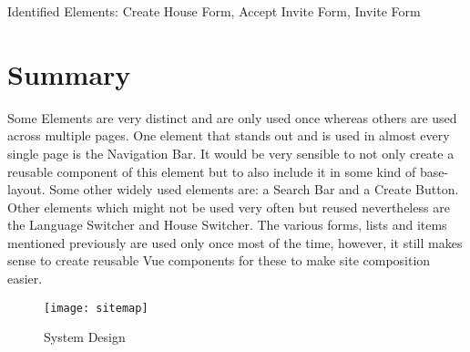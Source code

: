Identified Elements: Create House Form, Accept Invite Form, Invite Form

\section{Summary}
Some Elements are very distinct and are only used once whereas others are used across multiple pages. One element that stands out and is used in almost every single page is the Navigation Bar. It would be very sensible to not only create a reusable component of this element but to also include it in some kind of base-layout. Some other widely used elements are: a Search Bar and a Create Button. Other elements which might not be used very often but reused nevertheless are the Language Switcher and House Switcher. The various forms, lists and items mentioned previously are used only once most of the time, however, it still makes sense to create reusable Vue components for these to make site composition easier.

\begin{figure}[H]
    \begin{center}
    \texttt{[image: sitemap]}
    \end{center}
    \caption{System Design}
    \label{fig:usecases}
\end{figure}

